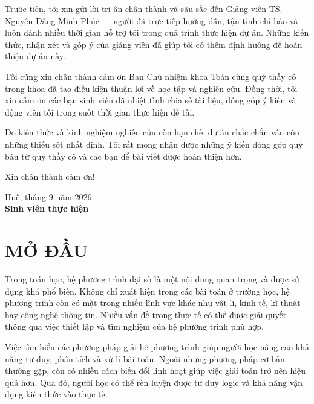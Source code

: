 \documentclass[12pt,a4paper,oneside]{book}
\theoremstyle{theorem}
\theoremstyle{definition}
\begin{document}
Trước tiên, tôi xin gửi lời tri ân chân thành và sâu sắc đến Giảng viên TS. Nguyễn Đăng Minh Phúc — người đã trực tiếp hướng dẫn, tận tình chỉ bảo và luôn dành nhiều thời gian hỗ trợ tôi trong quá trình thực hiện dự án. Những kiến thức, nhận xét và góp ý của giảng viên đã giúp tôi có thêm định hướng để hoàn thiện dự án này.

Tôi cũng xin chân thành cảm ơn Ban Chủ nhiệm khoa Toán cùng quý thầy cô trong khoa đã tạo điều kiện thuận lợi về học tập và nghiên cứu. Đồng thời, tôi xin cảm ơn các bạn sinh viên đã nhiệt tình chia sẻ tài liệu, đóng góp ý kiến và động viên tôi trong suốt thời gian thực hiện đề tài.

Do kiến thức và kinh nghiệm nghiên cứu còn hạn chế, dự án chắc chắn vẫn còn những thiếu sót nhất định. Tôi rất mong nhận được những ý kiến đóng góp quý báu từ quý thầy cô và các bạn để bài viết được hoàn thiện hơn.

Xin chân thành cảm ơn!

\begin{flushright}
Huế, tháng 9 năm 2026\\[0.3cm]
\textbf{Sinh viên thực hiện}
\end{flushright}


    \chapter*{MỞ ĐẦU}
Trong toán học, hệ phương trình đại số là một nội dung quan trọng và được sử dụng khá phổ biến. Không chỉ xuất hiện trong các bài toán ở trường học, hệ phương trình còn có mặt trong nhiều lĩnh vực khác như vật lí, kinh tế, kĩ thuật hay công nghệ thông tin. Nhiều vấn đề trong thực tế có thể được giải quyết thông qua việc thiết lập và tìm nghiệm của hệ phương trình phù hợp.

Việc tìm hiểu các phương pháp giải hệ phương trình giúp người học nâng cao khả năng tư duy, phân tích và xử lí bài toán. Ngoài những phương pháp cơ bản thường gặp, còn có nhiều cách biến đổi linh hoạt giúp việc giải toán trở nên hiệu quả hơn. Qua đó, người học có thể rèn luyện được tư duy logic và khả năng vận dụng kiến thức vào thực tế.
\end{document}
